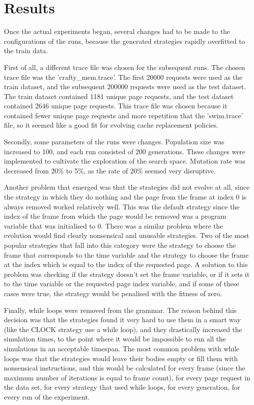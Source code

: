 \section{Results}
Once the actual experiments began, several changes had to be made to the configurations of the runs, because the generated strategies rapidly overfitted to the train data.

First of all, a different trace file was chosen for the subsequent runs. The chosen trace file was the 'crafty\_mem.trace'. The first 20000 requests were used as the train dataset, and the subsequent 200000 requests were used as the test dataset. The train dataset contained 1181 unique page requests, and the test dataset contained 2646 unique page requests. This trace file was chosen because it contained fewer unique page requests and more repetition that the 'swim.trace' file, so it seemed like a good fit for evolving cache replacement policies.

Secondly, some parameters of the runs were changes. Population size was increased to 100, and each run consisted of 200 generations. These changes were implemented to cultivate the exploration of the search space. Mutation rate was decreased from 20\% to 5\%, as the rate of 20\% seemed very disruptive.

Another problem that emerged was that the strategies did not evolve at all, since the strategy in which they do nothing and the page from the frame at index 0 is always removed worked relatively well. This was the default strategy since the index of the frame from which the page would be removed was a program variable that was initialised to 0. There was a similar problem where the evolution would find clearly nonsensical and unusable strategies. Two of the most popular strategies that fall into this category were the strategy to choose the frame that corresponds to the time variable and the strategy to choose the frame at the index which is equal to the index of the requested page. A solution to this problem was checking if the strategy doesn't set the frame variable, or if it sets it to the time variable or the requested page index variable, and if some of these cases were true, the strategy would be penalised with the fitness of zero.

Finally, while loops were removed from the grammar. The reason behind this decision was that the strategies found it very hard to use them in a smart way (like the CLOCK strategy use a while loop), and they drastically increased the simulation times, to the point where it would be impossible to run all the simulations in an acceptable timespan. The most common problem with while loops was that the strategies would leave their bodies empty or fill them with nonsensical instructions, and this would be calculated for every frame (since the maximum number of iterations is equal to frame count), for every page request in the data set, for every strategy that used while loops, for every generation, for every run of the experiment.

